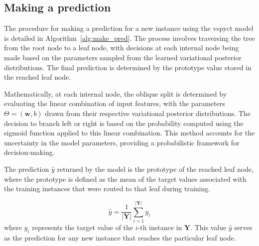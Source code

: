 \documentclass[3p,review,authoryear]{elsarticle}
\begin{document}
\subsection{Making a prediction}

The procedure for making a prediction for a new instance using the \gls{vspyct} model is detailed in Algorithm~\ref{alg:make_pred}.
The process involves traversing the tree from the root node to a leaf node, with decisions at each internal node being made  based on the parameters sampled from the learned variational posterior distributions.
The final prediction is determined by the prototype value stored in the reached leaf node.

Mathematically, at each internal node, the oblique split is determined by evaluating the linear combination of input features, with the parameters \(\Theta = (\mathbf{w}, b)\) drawn from their respective variational posterior distributions. The decision to branch left or right is based on the probability computed using the sigmoid function applied to this linear combination. This method accounts for the uncertainty in the model parameters, providing a probabilistic framework for decision-making.

The prediction \(\hat{y}\) returned by the model is the prototype of the reached leaf node, where the prototype is defined as the mean of the target values associated with the training instances that were routed to that leaf during training.

\begin{equation}
\hat{y} = \frac{1}{|\mathbf{Y}|} \sum_{i=1}^{|\mathbf{Y}|} y_i
\end{equation}
where \( y_i \) represents the target value of the \(i\)-th instance in \(\mathbf{Y}\).
This value $\hat{y}$ serves as the prediction for any new instance that reaches the particular leaf node.
\end{document}
